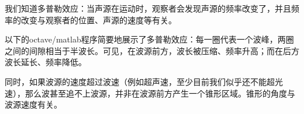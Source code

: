 
我们知道多普勒效应：当声源在运动时，观察者会发现声源的频率改变了，并且频率的改变与观察者的位置、声源的速度等有关。

以下的octave/matlab程序简要地展示了多普勒效应：每一圈代表一个波峰，两圈之间的间隙相当于半波长。可见，在波源前方，波长被压缩、频率升高；而在后方波长延长、频率降低。

同时，如果波源的速度超过波速（例如超声速，至少目前我们似乎还不能超光速），那么波甚至追不上波源，并非在波源前方产生一个锥形区域。锥形的角度与波源速度有关。

